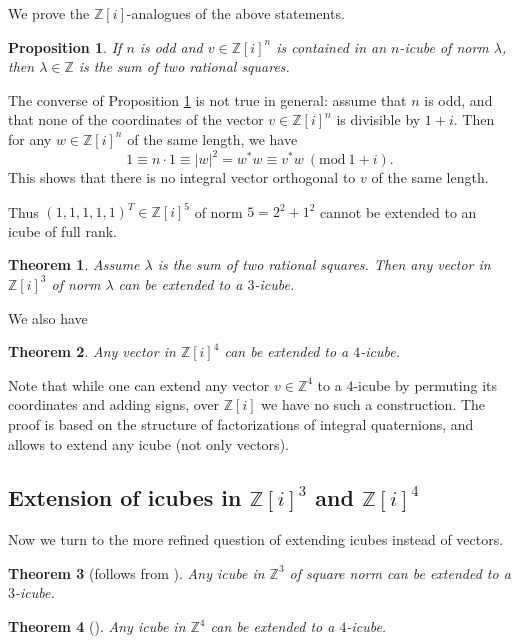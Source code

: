 \documentclass[11pt]{amsart}
\newcommand{\Mod}[1]{~(\mathrm{mod}~#1)}
\newcommand{\ZZ}{\mathbb{Z}}
\newtheorem{theorem}{Theorem}
\newtheorem{proposition}{Proposition}[section]
\theoremstyle{definition}
\theoremstyle{remark}
\begin{document}
We prove the $\mathbb Z[i]$-analogues of the above statements.

\begin{proposition}\label{2kp1i}
If $n$ is odd and $v\in\mathbb Z[i]^n$ is contained in an $n$-icube of norm $\lambda$, then $\lambda\in\mathbb Z$ is the sum of two rational squares.
\end{proposition}

The converse of Proposition \ref{2kp1i} is not true in general: assume that $n$ is odd, and that none of the coordinates of the vector $v\in\ZZ[i]^n$ is divisible by $1+i$. Then for any $w\in\ZZ[i]^n$ of the same length, we have
\[1\equiv n\cdot1\equiv |w|^2=w^*w\equiv v^*w \Mod{1+i}.\]
This shows that there is no integral vector orthogonal to $v$ of the same length.


Thus $(1,1,1,1,1)^T\in\mathbb Z[i]^5$ of norm $5=2^2+1^2$ cannot be extended to an icube of full rank. 

\begin{theorem}\label{3Ziv}
Assume $\lambda$ is the sum of two rational squares. Then any vector in $\ZZ[i]^3$ of norm $\lambda$ can be extended to a $3$-icube.
\end{theorem}

We also have
\begin{theorem}\label{4Ziv}
Any vector in $\ZZ[i]^4$  can be extended to a $4$-icube.
\end{theorem}

Note that while one can extend any vector $v\in\ZZ^4$ to a $4$-icube by permuting its coordinates and adding signs, over $\ZZ[i]$ we have no such a construction. The proof is based on the structure of factorizations of integral quaternions, and allows to extend any icube (not only vectors).




\subsection{Extension of icubes in $\ZZ[i]^3$ and $\ZZ[i]^4$}

Now we turn to the more refined question of extending icubes instead of vectors.

\begin{theorem}[follows from {\cite[Theorem~1.1]{KissKutas}}]\label{3Z}
Any icube in $\ZZ^3$ of square norm can be extended to a $3$-icube.
\end{theorem}
\begin{theorem}[{\cite[Theorem~1.2]{KissKutas}}]\label{4Z}
Any icube in $\ZZ^4$ can be extended to a $4$-icube.
\end{theorem}
\end{document}

